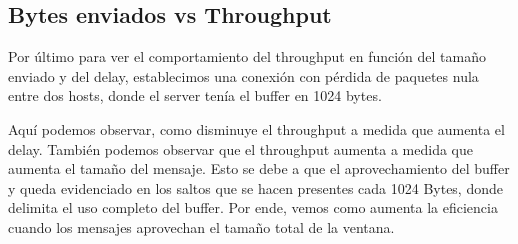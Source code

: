 \subsection{Bytes enviados vs Throughput}
  Por \'ultimo para ver el comportamiento del throughput en funci\'on del tama\~no enviado y del delay, establecimos una conexi\'on con p\'erdida de paquetes nula entre dos hosts, donde el server ten\'ia el buffer en 1024 bytes. 


  Aqu\'i podemos observar, como disminuye el throughput a medida que aumenta el delay. Tambi\'en podemos observar que el throughput aumenta a medida que aumenta el tama\~no del mensaje. Esto se debe a que el aprovechamiento del buffer y queda evidenciado en los saltos que se hacen presentes cada 1024 Bytes, donde delimita el uso completo del buffer.
  Por ende, vemos como aumenta la eficiencia cuando los mensajes aprovechan el tama\~no total de la ventana.